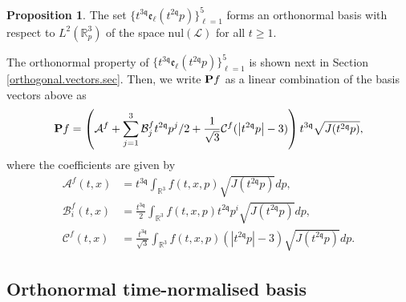 \documentclass[reqno]{amsart}
\newcommand{\pv}{p}
\newcommand{\rth}{{\mathbb{R}^3}}
\def\R{\mathbb R}
\newcommand{\vnrm}[1]{\left\vert#1\right\vert}
\newcommand{\qq}{\mathfrak{q}}
\newcommand{\tqq}{t^{2\qq}}
\newcommand{\tTq}{t^{3\qq}}
\newcommand{\linL}{\mathcal{L}}
\theoremstyle{definition}
\newtheorem{proposition}[theorem]{Proposition}
\numberwithin{equation}{section}
\numberwithin{theorem}{section}
\begin{document}
\begin{proposition}\label{prop_orthnorm_nul}
    The set $\{ \tTq\mathfrak{e}_\ell(\tqq p)\}_{\ell=1}^5$ forms an orthonormal basis with respect to \(L^2(\R_p^3)\) of the space \(\mathrm{nul}(\linL)\) for all \(t\geq 1\).
\end{proposition}

The orthonormal property of $\{ \tTq\mathfrak{e}_\ell(\tqq p)\}_{\ell=1}^5$ is shown next in Section \ref{orthogonal.vectors.sec}.  Then, we write ${\bf P}f$ as a linear combination of the basis vectors above as
\begin{equation}
\label{macrofbasis}
{\bf P}f=\left(  \mathcal{A}^f+\sum_{j=1}^{3} \mathcal{B}^f_j\tqq p^j/2+\frac{1}{\sqrt{3}}\mathcal{C}^f(\vnrm{\tqq\pv}-3)\right) \tTq\sqrt{J(\tqq p)},
\end{equation}
where the coefficients are given by
\begin{equation}\label{defmacrocoef}
\begin{split}
    \mathcal{A}^f(t,x) & = \tTq\int_\rth f(t,x,\pv)\sqrt{J(\tqq p)}dp,
    \\
    \mathcal{B}_i^f (t,x)
    & =
    \frac{\tTq}{2}\int_\rth f(t,x,\pv) \tqq p^i\sqrt{J(\tqq p)}dp, 
    \\
    \mathcal{C}^f(t,x)
    &=
    \frac{\tTq}{\sqrt{3}}\int_{\rth}f(t,x,\pv)( |\tqq \pv |-3)\sqrt{J(\tqq p)} dp.
\end{split}
\end{equation}



\subsection{Orthonormal time-normalised basis}\label{subs_orth_norm14}
\end{document}
